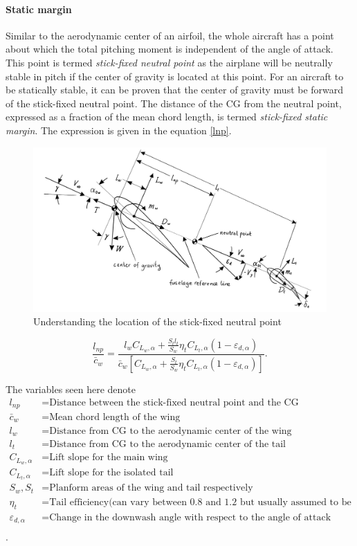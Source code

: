 \documentclass[letterpaper,12pt]{article}
\begin{document}
\paragraph{Static margin}
Similar to the aerodynamic center of an airfoil, the whole aircraft has a point about which the total pitching moment is independent of the angle of attack. This point is termed \textit{stick-fixed neutral point} as the airplane will be neutrally stable in pitch if the center of gravity is located at this point. For an aircraft to be statically stable, it can be proven that the center of gravity must be forward of the stick-fixed neutral point. The distance of the CG from the neutral point, expressed as a fraction of the mean chord length, is termed \textit{stick-fixed static margin}. The expression is given in the equation \ref{lnp}.
\begin{figure}[H]
\includegraphics[scale=0.35]{st_margin}
\centering
\caption{Understanding the location of the stick-fixed neutral point}
\label{sm1}
\end{figure}
\begin{equation}
\boxed{
\frac{l_{np}}{\bar c_w}=\frac{l_wC_{L_w,\alpha}+\frac{S_tl_t}{S_w}\eta_tC_{L_t,\alpha}(1-\varepsilon_{d,\alpha})}{\bar c_w\left[C_{L_w,\alpha}+\frac{S_t}{S_w}\eta_tC_{L_t,\alpha}(1-\varepsilon_{d,\alpha})\right]}.
}
\label{lnp}
\end{equation}

The variables seen here denote
\begin{align*}
l_{np}&=\text{Distance between the stick-fixed neutral point and the CG}\\
\bar c_w&=\text{Mean chord length of the wing}\\
l_w&=\text{Distance from CG to the aerodynamic center of the wing}\\
l_t&=\text{Distance from CG to the aerodynamic center of the tail}\\
C_{L_w,\alpha}&=\text{Lift slope for the main wing}\\
C_{L_t,\alpha}&=\text{Lift slope for the isolated tail}\\
S_w, S_t&=\text{Planform areas of the wing and tail respectively}\\
\eta_t&=\text{Tail efficiency(can vary between 0.8 and 1.2 but usually assumed to be 1)}\\
\varepsilon_{d,\alpha}&=\text{Change in the downwash angle with respect to the angle of attack}\\
\end{align*}.
\end{document}
